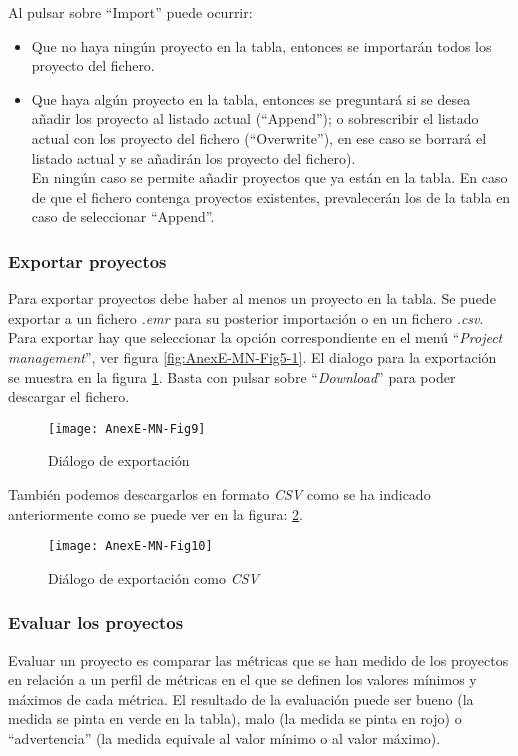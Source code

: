 Al pulsar sobre ``Import'' puede ocurrir:
\begin{itemize}
	\item Que no haya ningún proyecto en la tabla, entonces se importarán todos los proyecto del fichero.
	\item Que haya algún proyecto en la tabla, entonces se preguntará si se desea añadir los proyecto al listado actual (``Append''); o sobrescribir el listado actual con los proyecto del fichero (``Overwrite''), en ese caso se borrará el listado actual y se añadirán los proyecto del fichero).\\
	En ningún caso se permite añadir proyectos que ya están en la tabla. En caso de que el fichero contenga proyectos existentes, prevalecerán los de la tabla en caso de seleccionar ``Append''.
\end{itemize}


\subsubsection{Exportar proyectos}
Para exportar proyectos debe haber al menos un proyecto en la tabla.
Se puede exportar a un fichero \textit{.emr} para su posterior importación o en un fichero \textit{.csv}. Para exportar hay que seleccionar la opción correspondiente en el menú ``\textit{Project management}'', ver figura \ref{fig:AnexE-MN-Fig5-1}. El dialogo para la exportación se muestra en la figura \ref{fig:AnexE-MN-Fig9}. Basta con pulsar sobre ``\textit{Download}'' para poder descargar el fichero.
\begin{figure}[!h]
	\centering
	\texttt{[image: AnexE-MN-Fig9]}
	\caption{Diálogo de exportación}\label{fig:AnexE-MN-Fig9}
\end{figure}
\FloatBarrier

También podemos descargarlos en formato \textit{CSV} como se ha indicado anteriormente como se puede ver en la figura: \ref{fig:AnexE-MN-Fig10}.
\begin{figure}[!h]
	\centering
	\texttt{[image: AnexE-MN-Fig10]}
	\caption{Diálogo de exportación como \textit{CSV}}\label{fig:AnexE-MN-Fig10}
\end{figure}
\FloatBarrier


\subsubsection{Evaluar los proyectos}
Evaluar un proyecto es comparar las métricas que se han medido de los proyectos en relación a un perfil de métricas en el que se definen los valores mínimos y máximos de cada métrica. El resultado de la evaluación puede ser bueno (la medida se pinta en verde en la tabla), malo (la medida se pinta en rojo) o ``advertencia'' (la medida equivale al valor mínimo o al valor máximo).

